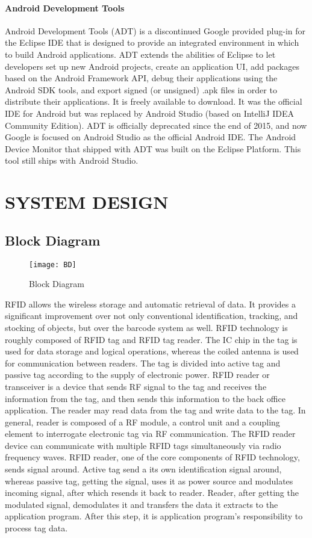 \documentclass[12pt,a4paper]{report}
\begin{document}
\subsubsection{Android Development Tools}
Android Development Tools (ADT) is a discontinued Google provided plug-in for the Eclipse IDE that is designed to provide an integrated environment in which to build Android applications. ADT extends the abilities of Eclipse to let developers set up new Android projects, create an application UI, add packages based on the Android Framework API, debug their applications using the Android SDK tools, and export signed (or unsigned) .apk files in order to distribute their applications. It is freely available to download. It was the official IDE for Android but was replaced by Android Studio (based on IntelliJ IDEA Community Edition). ADT is officially deprecated since the end of 2015, and now Google is focused on Android Studio as the official Android IDE. The Android Device Monitor that shipped with ADT was built on the Eclipse Platform. This tool still ships with Android Studio.

\chapter{SYSTEM DESIGN}
\newpage
\section{Block Diagram}
\begin{figure}[H]
	\begin{center}
		\texttt{[image: BD]}
		\caption{Block Diagram}
	\end{center}
\end{figure}

RFID allows the wireless storage and automatic retrieval of data. It provides a significant
improvement over not only conventional identification, tracking, and stocking of objects, but over
the barcode system as well. 
RFID technology is roughly composed of RFID tag and RFID tag reader. 
The IC chip in the tag is used for data storage and logical operations, whereas the coiled antenna is
used for communication between readers. The tag is divided
into active tag and passive tag according to the supply of electronic power. RFID reader or
transceiver is a device that sends RF signal to the tag and receives the information from the tag, and
then sends this information to the back office application. The reader may read data from the tag
and write data to the tag. In general, reader is composed of a RF module, a control unit and a
coupling element to interrogate electronic tag via RF communication. The RFID reader device can
communicate with multiple RFID tags simultaneously via radio frequency waves.
RFID reader, one of the core components of RFID technology, sends signal around. Active tag send a
its own identification signal around, whereas passive tag, getting the signal, uses it as power source
and modulates incoming signal, after which resends it back to reader. Reader, after getting the
modulated signal, demodulates it and transfers the data it extracts to the application program. After
this step, it is application program's responsibility to process tag data.
\end{document}
